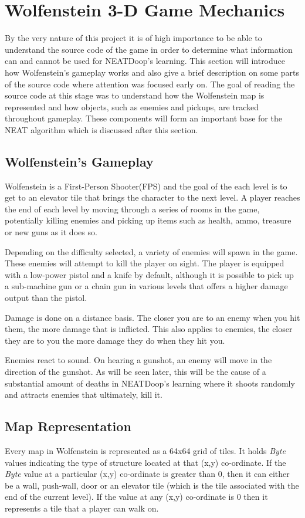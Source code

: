 \documentclass[]{Learning-to-Play-Wolfenstein-thesis}
\begin{document}
\section{Wolfenstein 3-D Game Mechanics}
By the very nature of this project it is of high importance to be able to understand the source code of the game in order to determine what information can and cannot be used for NEATDoop's learning. This section will introduce how Wolfenstein's gameplay works and also give a brief description on some parts of the source code where attention was  focused early on. The goal of reading the source code at this stage was to understand how the Wolfenstein map is represented and how objects, such as enemies and pickups, are tracked throughout gameplay. These components will form an important base for the NEAT algorithm which is discussed after this section.

\subsection{Wolfenstein's Gameplay}
Wolfenstein is a First-Person Shooter(FPS) and the goal of the each level is to get to an elevator tile that brings the character to the next level. A player reaches the end of each level by moving through a series of rooms in the game, potentially killing enemies and picking up items such as health, ammo, treasure or new guns as it does so. 

Depending on the difficulty selected, a variety of enemies will spawn in the game. These enemies will attempt to kill the player on sight. The player is equipped with a low-power pistol and a knife by default, although it is possible to pick up a sub-machine gun or a chain gun in various levels that offers a higher damage output than the pistol. 

Damage is done on a distance basis. The closer you are to an enemy when you hit them, the more damage that is inflicted. This also applies to enemies, the closer they are to you the more damage they do when they hit you. 

Enemies react to sound. On hearing a gunshot, an enemy will move in the direction of the gunshot. As will be seen later, this will be the cause of a substantial amount of deaths in NEATDoop's learning where it shoots randomly and attracts enemies that ultimately, kill it.

\subsection{Map Representation}
Every map in Wolfenstein is represented as a 64x64 grid of tiles. It holds \textit{Byte} values indicating the type of structure located at that (x,y) co-ordinate. If the \textit{Byte} value at a particular (x,y) co-ordinate is greater than 0, then it can either be a wall, push-wall, door or an elevator tile (which is the tile associated with the end of the current level). If the value at any (x,y) co-ordinate is 0 then it represents a tile that a player can walk on.
\end{document}
